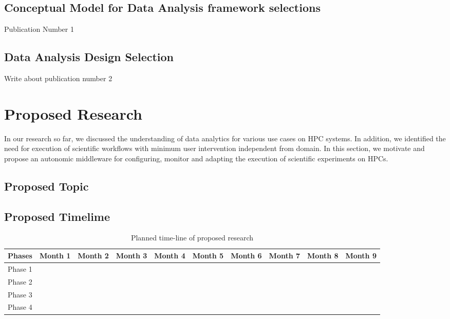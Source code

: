 \subsection{Conceptual Model for Data Analysis framework selections}

Publication Number 1 ~\cite{paraskevakos2018task}

\subsection{Data Analysis Design Selection}

Write about publication number 2

\section{Proposed Research}

In our research so far, we discussed the understanding of data analytics for 
various use cases on HPC systems. In addition, we identified the need for 
execution of scientific workflows with minimum user intervention independent 
from domain. In this section, we motivate and propose an autonomic middleware 
for configuring, monitor and adapting the execution of scientific experiments 
on HPCs.

\subsection{Proposed Topic}



\subsection{Proposed Timelime}
\begin{table*}
	\centering
	\begin{tabular}{ |p{1.25cm}|p{1.25cm} p{1.25cm} p{1.25cm} p{1.25cm} p{1.25cm} p{1.25cm} p{1.25cm} p{1.25cm} p{1.25cm}|}
		\hline
		Phases  & Month 1 & Month 2 & Month 3 & Month 4 & Month 5 & Month 6 & Month 7 & Month 8 & Month 9 \\\hline\hline
		Phase 1 &         &         &         &         &         &         &         &         &         \\\hline
		Phase 2 &         &         &         &         &         &         &         &         &         \\\hline
		Phase 3 &         &         &         &         &         &         &         &         &         \\\hline
		Phase 4 &         &         &         &         &         &         &         &         &         \\\hline
	\end{tabular}
\caption{Planned time-line of proposed research}\label{tab:work_plan}
\end{table*}

